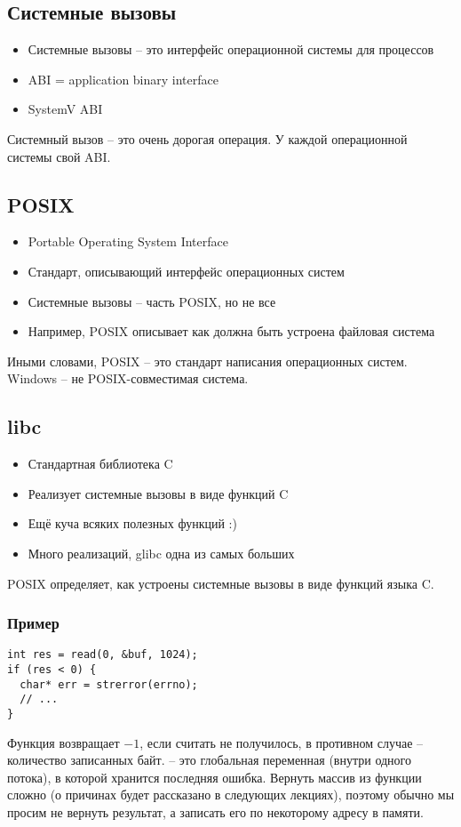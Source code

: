     \subsection{Системные вызовы}
    \begin{itemize}
      \item Системные вызовы -- это интерфейс операционной системы для процессов
      \item ABI = application binary interface
      \item SystemV ABI
    \end{itemize}
    Системный вызов -- это очень дорогая операция. У каждой операционной системы свой ABI.
    
    \subsection{POSIX}
    \begin{itemize}
      \item Portable Operating System Interface
      \item Стандарт, описывающий интерфейс операционных систем
      \item Системные вызовы -- часть POSIX, но не все
      \item Например, POSIX описывает как должна быть устроена файловая система
    \end{itemize}
    Иными словами, POSIX -- это стандарт написания операционных систем. Windows -- не POSIX-совместимая система.
    
    \subsection{libc}
    \begin{itemize}
      \item Стандартная библиотека C
      \item Реализует системные вызовы в виде функций C
      \item Ещё куча всяких полезных функций :)
      \item Много реализаций, glibc одна из самых больших
    \end{itemize}
    POSIX определяет, как устроены системные вызовы в виде функций языка C.
    
    \subsubsection{Пример}
\begin{lstlisting}[style=cpp]
int res = read(0, &buf, 1024);
if (res < 0) {
  char* err = strerror(errno);
  // ...
}
\end{lstlisting}
Функция  возвращает $-1$, если считать не получилось, в противном случае -- количество записанных байт. \newline
{} -- это глобальная переменная (внутри одного потока), в которой хранится последняя ошибка.\newline
Вернуть массив из функции сложно (о причинах будет рассказано в следующих лекциях), поэтому обычно мы просим не вернуть результат, а записать его по некоторому адресу в памяти.

